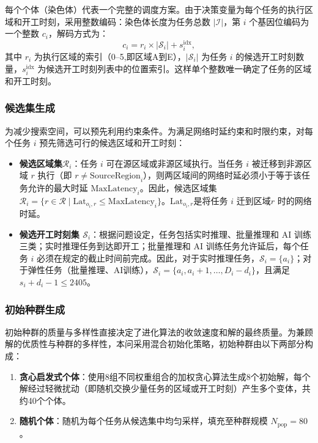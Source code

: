 \documentclass[UTF8,a4paper,zihao=-4]{ctexart}
\begin{document}
每个个体（染色体）代表一个完整的调度方案。由于决策变量为每个任务的执行区域和开工时刻，采用整数编码：染色体长度为任务总数 $|\mathcal{I}|$，第 $i$ 个基因位编码为一个整数 $c_i$，解码方式为：
\[
c_i = r_i \times |\mathcal{S}_i| + s_i^{\text{idx}},
\]
其中 $r_i$ 为执行区域的索引（0--5,即区域A到E），$|\mathcal{S}_i|$ 为任务 $i$ 的候选开工时刻数量，$s_i^{\text{idx}}$ 为候选开工时刻列表中的位置索引。这样单个整数唯一确定了任务的区域和开工时刻。

\subsubsection{候选集生成}

为减少搜索空间，可以预先利用约束条件。为满足网络时延约束和时限约束，对每个任务 $i$ 预先筛选可行的候选区域和开工时刻：
\begin{itemize}
    \item \textbf{候选区域集$\mathcal{R}_i$}：任务 \(i\) 可在源区域或非源区域执行。当任务 \(i\) 被迁移到非源区域 \(r\) 执行（即 \(r \neq \mathrm{SourceRegion}_i\)），则两区域间的网络时延必须小于等于该任务允许的最大时延 \(\mathrm{MaxLatency}_i\)。因此，候选区域集 $\mathcal{R}_i = \{ r \in \mathcal{R} \mid \text{Lat}_{o_i,r} \leq \text{MaxLatency}_i \}$。$\text{Lat}_{o_i,r} $是将任务 \(i\) 迁到区域\(r\) 时的网络时延。
    \item \textbf{候选开工时刻集 $\mathcal{S}_i$}：根据问题设定，任务包括实时推理、批量推理和 AI 训练三类；实时推理任务到达即开工；批量推理和 AI 训练任务允许延后，每个任务 \(i\) 必须在规定的截止时间前完成。因此，对于实时推理任务，$\mathcal{S}_i = \{a_i\}$；对于弹性任务（批量推理、AI训练），$\mathcal{S}_i = \{a_i, a_i+1, \dots, D_i - d_i\}$，且满足 $s_i + d_i - 1 \leq 2405$。
\end{itemize}

\subsubsection{初始种群生成}

初始种群的质量与多样性直接决定了进化算法的收敛速度和解的最终质量。为兼顾解的优质性与种群的多样性，本问采用混合初始化策略，初始种群由以下两部分构成：

\begin{enumerate}
    \item \textbf{贪心启发式个体}：使用8组不同权重组合的加权贪心算法生成8个初始解，每个解经过轻微扰动（即随机交换少量任务的区域或开工时刻）产生多个变体，共约40个个体。
    \item \textbf{随机个体}：随机为每个任务从候选集中均匀采样，填充至种群规模 $N_{\text{pop}} = 80$。
\end{enumerate}
\end{document}
